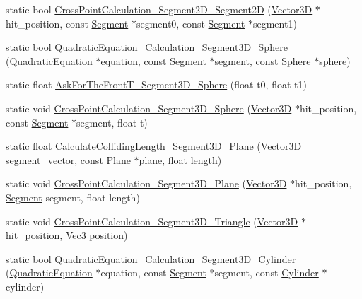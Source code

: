 \begin{DoxyCompactItemize}
\item 
static bool \mbox{\hyperlink{class_collision_judgment_a25e0fb020e2a075322c9540bdd13b6c2}{Cross\+Point\+Calculation\+\_\+\+Segment2\+D\+\_\+\+Segment2D}} (\mbox{\hyperlink{class_vector3_d}{Vector3D}} $\ast$hit\+\_\+position, const \mbox{\hyperlink{class_segment}{Segment}} $\ast$segment0, const \mbox{\hyperlink{class_segment}{Segment}} $\ast$segment1)
\item 
static bool \mbox{\hyperlink{class_collision_judgment_adf8acb73719d92f6b5dbd9a6989571ad}{Quadratic\+Equation\+\_\+\+Calculation\+\_\+\+Segment3\+D\+\_\+\+Sphere}} (\mbox{\hyperlink{class_quadratic_equation}{Quadratic\+Equation}} $\ast$equation, const \mbox{\hyperlink{class_segment}{Segment}} $\ast$segment, const \mbox{\hyperlink{class_sphere}{Sphere}} $\ast$sphere)
\item 
static float \mbox{\hyperlink{class_collision_judgment_adbf036202ba174c7e9fc10329aeaa2c1}{Ask\+For\+The\+Front\+T\+\_\+\+Segment3\+D\+\_\+\+Sphere}} (float t0, float t1)
\item 
static void \mbox{\hyperlink{class_collision_judgment_a5a2de0fe24c1a632c3ee23a20853a57a}{Cross\+Point\+Calculation\+\_\+\+Segment3\+D\+\_\+\+Sphere}} (\mbox{\hyperlink{class_vector3_d}{Vector3D}} $\ast$hit\+\_\+position, const \mbox{\hyperlink{class_segment}{Segment}} $\ast$segment, float t)
\item 
static float \mbox{\hyperlink{class_collision_judgment_aad2a3d57a7b1c44e894b7a6c1a6ecde0}{Calculate\+Colliding\+Length\+\_\+\+Segment3\+D\+\_\+\+Plane}} (\mbox{\hyperlink{class_vector3_d}{Vector3D}} segment\+\_\+vector, const \mbox{\hyperlink{class_plane}{Plane}} $\ast$plane, float length)
\item 
static void \mbox{\hyperlink{class_collision_judgment_a1a36d9be481597ed39b42e6f261ee508}{Cross\+Point\+Calculation\+\_\+\+Segment3\+D\+\_\+\+Plane}} (\mbox{\hyperlink{class_vector3_d}{Vector3D}} $\ast$hit\+\_\+position, \mbox{\hyperlink{class_segment}{Segment}} segment, float length)
\item 
static void \mbox{\hyperlink{class_collision_judgment_a663c13a9729109b140b9ab6e022fd469}{Cross\+Point\+Calculation\+\_\+\+Segment3\+D\+\_\+\+Triangle}} (\mbox{\hyperlink{class_vector3_d}{Vector3D}} $\ast$hit\+\_\+position, \mbox{\hyperlink{_vector3_d_8h_ab16f59e4393f29a01ec8b9bbbabbe65d}{Vec3}} position)
\item 
static bool \mbox{\hyperlink{class_collision_judgment_aa7d814d54f323c366de1d068440ded2b}{Quadratic\+Equation\+\_\+\+Calculation\+\_\+\+Segment3\+D\+\_\+\+Cylinder}} (\mbox{\hyperlink{class_quadratic_equation}{Quadratic\+Equation}} $\ast$equation, const \mbox{\hyperlink{class_segment}{Segment}} $\ast$segment, const \mbox{\hyperlink{class_cylinder}{Cylinder}} $\ast$cylinder)

\end{DoxyCompactItemize}

